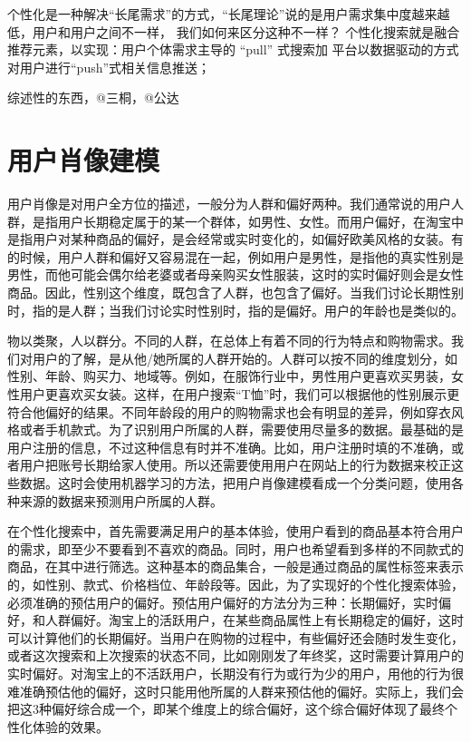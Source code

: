 个性化是一种解决“长尾需求”的方式，“长尾理论”说的是用户需求集中度越来越低，用户和用户之间不一样，
我们如何来区分这种不一样？ 个性化搜索就是融合推荐元素，以实现：用户个体需求主导的 “pull” 式搜索加
平台以数据驱动的方式对用户进行“push”式相关信息推送；


综述性的东西，@三桐，@公达

\section{用户肖像建模} 
	用户肖像是对用户全方位的描述，一般分为人群和偏好两种。我们通常说的用户人群，是指用户长期稳定属于的某一个群体，如男性、女性。而用户偏好，在淘宝中是指用户对某种商品的偏好，是会经常或实时变化的，如偏好欧美风格的女装。有的时候，用户人群和偏好又容易混在一起，例如用户是男性，是指他的真实性别是男性，而他可能会偶尔给老婆或者母亲购买女性服装，这时的实时偏好则会是女性商品。因此，性别这个维度，既包含了人群，也包含了偏好。当我们讨论长期性别时，指的是人群；当我们讨论实时性别时，指的是偏好。用户的年龄也是类似的。
	
	物以类聚，人以群分。不同的人群，在总体上有着不同的行为特点和购物需求。我们对用户的了解，是从他/她所属的人群开始的。人群可以按不同的维度划分，如性别、年龄、购买力、地域等。例如，在服饰行业中，男性用户更喜欢买男装，女性用户更喜欢买女装。这样，在用户搜索“T恤”时，我们可以根据他的性别展示更符合他偏好的结果。不同年龄段的用户的购物需求也会有明显的差异，例如穿衣风格或者手机款式。为了识别用户所属的人群，需要使用尽量多的数据。最基础的是用户注册的信息，不过这种信息有时并不准确。比如，用户注册时填的不准确，或者用户把账号长期给家人使用。所以还需要使用用户在网站上的行为数据来校正这些数据。这时会使用机器学习的方法，把用户肖像建模看成一个分类问题，使用各种来源的数据来预测用户所属的人群。
	
	在个性化搜索中，首先需要满足用户的基本体验，使用户看到的商品基本符合用户的需求，即至少不要看到不喜欢的商品。同时，用户也希望看到多样的不同款式的商品，在其中进行筛选。这种基本的商品集合，一般是通过商品的属性标签来表示的，如性别、款式、价格档位、年龄段等。因此，为了实现好的个性化搜索体验，必须准确的预估用户的偏好。预估用户偏好的方法分为三种：长期偏好，实时偏好，和人群偏好。淘宝上的活跃用户，在某些商品属性上有长期稳定的偏好，这时可以计算他们的长期偏好。当用户在购物的过程中，有些偏好还会随时发生变化，或者这次搜索和上次搜索的状态不同，比如刚刚发了年终奖，这时需要计算用户的实时偏好。对淘宝上的不活跃用户，长期没有行为或行为少的用户，用他的行为很难准确预估他的偏好，这时只能用他所属的人群来预估他的偏好。实际上，我们会把这3种偏好综合成一个，即某个维度上的综合偏好，这个综合偏好体现了最终个性化体验的效果。
	
